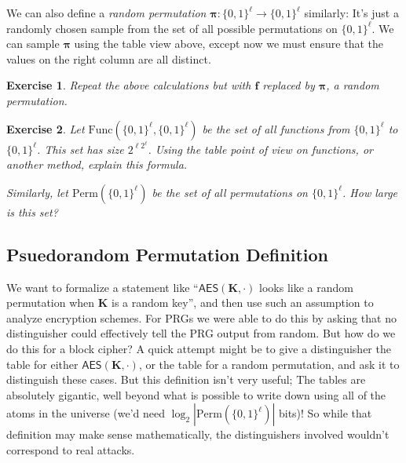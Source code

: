 \documentclass[11pt]{article}
\newtheorem{exercise}{Exercise}
\newcommand{\AES}{\mathsf{AES}}
\newcommand{\bits}{\{0,1\}}
\newcommand{\bK}{\mathbf{K}}
\newcommand{\bof}{\mathbf{f}}
\newcommand{\bop}{\bm{\pi}}
\newcommand{\Func}{\mathrm{Func}}
\newcommand{\Perm}{\mathrm{Perm}}
\begin{document}
We can also define a \emph{random permutation} $\bop:\bits^\ell\to\bits^\ell$
similarly: It's just a randomly chosen sample from the set of all possible
permutations on $\bits^\ell$. We can sample $\bop$ using the table view above,
except now we must ensure that the values on the right column are all distinct.

\begin{exercise}
    Repeat the above calculations but with $\bof$ replaced by $\bop$, a
    random permutation.
\end{exercise}


\begin{exercise}
    Let $\Func(\bits^\ell,\bits^\ell)$ be the set of all functions from
    $\bits^\ell$ to $\bits^\ell$. This set has size $2^{\ell2^\ell}$. Using the
    table point of view on functions, or another method, explain this formula.

    Similarly, let $\Perm(\bits^\ell)$ be  the set of all permutations on
    $\bits^\ell$. How large is this set?
\end{exercise}

\subsection{Psuedorandom Permutation Definition}

We want to formalize a statement like ``$\AES(\bK,\cdot)$ looks like a random
permutation when $\bK$ is a random key'', and then use such an assumption to
analyze encryption schemes. For PRGs we were able to do this by asking that no
distinguisher could effectively tell the PRG output from random.  But how do we
do this for a block cipher?  A quick attempt might be to give a distinguisher
the table for either $\AES(\bK,\cdot)$, or the table for a random permutation,
and ask it to distinguish these cases. But this definition isn't very useful;
The tables are absolutely gigantic, well beyond what is possible to write down
using all of the atoms in the universe (we'd need $\log_2|\Perm(\bits^\ell)|$ bits)! So while that definition may make sense
mathematically, the distinguishers involved wouldn't correspond to real
attacks.
\end{document}
